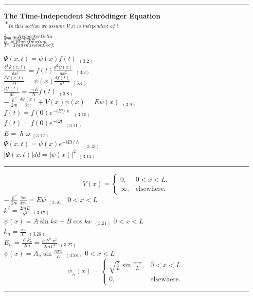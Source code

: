 \documentclass[0pt]{report}
\begin{document}
\begin{multicols}{3}
\begin{flushleft}
\noindent\rule[0.5ex]{\linewidth}{1pt}
\textbf{The Time-Independent Schrödinger Equation}\\

$*_{\textit{In this section we assume V(x) is independent of t}}$

\begin{multicols}{2}
$_{\delta_{nm}=KroneckerDelta}$\\
$_{a=Eigenvalue}$\\
$_{\psi_a=Eigenfunction}$\\
$_{T=TransmissionCoef.}$\\
\end{multicols}

$\Psi(x,t)=\psi(x)f(t)$ $_{(3.2)}$\\
$\frac{\delta^2\Psi(x,t)}{\delta x^2}=f(t)\frac{d^2\psi(x)}{dx^2}$ $_{(3.3)}$\\
$\frac{\delta\Psi(x,t)}{\delta t}=\psi(x)\frac{df(t)}{dt}$ $_{(3.4)}$\\
$\frac{df(t)}{dt}=\frac{-iE}{\hslash}f(t)$ $_{(3.8)}$\\
$-\frac{\hslash^2}{2m}\frac{\delta\psi(x)}{\delta x^2}+V(x)\psi(x)=E\psi(x)$ $_{(3.9)}$\\
$f(t)=f(0)e^{-iEt/\hslash}$ $_{(3.10)}$\\
$f(t)=f(0)e^{-i\omega t}$ $_{(3.11)}$\\
$E=\hslash\omega$ $_{(3.12)}$\\
$\Psi(x,t)=\psi(x)e^{-iEt/\hslash}$ $_{(3.13)}$\\
$|\Psi(x,t)|dd=|\psi(x)|^2$ $_{(3.14)}$\\

\noindent\rule[0.5ex]{\linewidth}{.25pt}
\begin{equation*}
  V(x)=\begin{cases}
    0, & \text{$0<x<L$}.\\
    \infty, & \text{elsewhere}.
  \end{cases}
\end{equation*}
$-\frac{\hslash^2}{2m}\frac{\delta\psi}{\delta x^2}=E\psi$ $_{(3.16)}$ $0<x<L$\\
$k^2=\frac{2mE}{\hslash^2}$ $_{(3.17)}$\\
$\psi(x)=A\sin kx+B\cos kx$ $_{(3.21)}$ $0<x<L$\\
$k_n=\frac{n\pi}{L}$ $_{(3.26)}$\\
$E_n=\frac{\hslash k_n^2}{2m}=\frac{n\hslash^2\pi^2}{2mL^2}$ $_{(3.27)}$\\
$\psi(x)=A_n\sin\frac{n\pi x}{L}$ $_{(3.28)}$ $0<x<L$\\
\begin{equation*}
  \psi_n(x)=\begin{cases}
    \sqrt{\frac{2}{L}}\sin\frac{n\pi x}{L}, & \text{$0<x<L$}.\\
    0, & \text{elsewhere}.
  \end{cases}
\end{equation*}
\noindent\rule[0.5ex]{\linewidth}{.25pt}


\end{flushleft}
\end{multicols}
\end{document}
